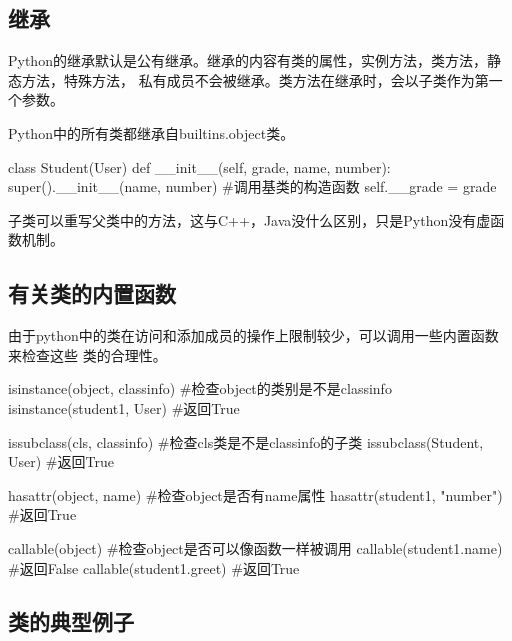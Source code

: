   \subsection{继承}
    Python的继承默认是公有继承。继承的内容有类的属性，实例方法，类方法，静态方法，特殊方法，
    私有成员不会被继承。类方法在继承时，会以子类作为第一个参数。

    Python中的所有类都继承自builtins.object类。
    \begin{codeblock}[language=python, caption={Class inheritance}]
      class Student(User)
          def __init__(self, grade, name, number):
              super().__init__(name, number) #调用基类的构造函数
              self.__grade = grade
    \end{codeblock}

    子类可以重写父类中的方法，这与C++，Java没什么区别，只是Python没有虚函数机制。

  \subsection{有关类的内置函数}
    由于python中的类在访问和添加成员的操作上限制较少，可以调用一些内置函数来检查这些
    类的合理性。
    \begin{codeblock}[language=python, caption={built-in functions about class}]
      isinstance(object, classinfo) #检查object的类别是不是classinfo
      isinstance(student1, User) #返回True

      issubclass(cls, classinfo) #检查cls类是不是classinfo的子类
      issubclass(Student, User) #返回True

      hasattr(object, name) #检查object是否有name属性
      hasattr(student1, "number") #返回True
      
      callable(object) #检查object是否可以像函数一样被调用
      callable(student1.name) #返回False
      callable(student1.greet) #返回True
    \end{codeblock}

  \subsection{类的典型例子}

